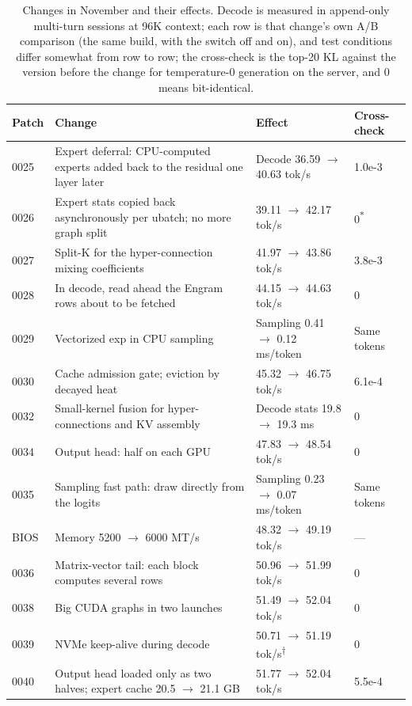 \documentclass[11pt,a4paper]{article}
\newcommand{\tps}{tok/s}
\begin{document}
\begin{table}[!tp]
  \centering
  \small
  \caption{Changes in November and their effects. Decode is measured in append-only multi-turn sessions at 96K context; each row is that change's own A/B comparison (the same build, with the switch off and on), and test conditions differ somewhat from row to row; the cross-check is the top-20 KL against the version before the change for temperature-0 generation on the server, and 0 means bit-identical.}
  \label{tab:summary2}
  \begin{tabularx}{\textwidth}{@{}l X l l@{}}
    \toprule
    Patch & Change & Effect & Cross-check \\
    \midrule
    0025 & Expert deferral: CPU-computed experts added back to the residual one layer later & Decode 36.59 $\to$ 40.63 \tps{} & 1.0e-3 \\
    0026 & Expert stats copied back asynchronously per ubatch; no more graph split & 39.11 $\to$ 42.17 \tps{} & 0\textsuperscript{*} \\
    0027 & Split-K for the hyper-connection mixing coefficients & 41.97 $\to$ 43.86 \tps{} & 3.8e-3 \\
    0028 & In decode, read ahead the Engram rows about to be fetched & 44.15 $\to$ 44.63 \tps{} & 0 \\
    0029 & Vectorized exp in CPU sampling & Sampling 0.41 $\to$ 0.12 ms/token & Same tokens \\
    0030 & Cache admission gate; eviction by decayed heat & 45.32 $\to$ 46.75 \tps{} & 6.1e-4 \\
    0032 & Small-kernel fusion for hyper-connections and KV assembly & Decode stats 19.8 $\to$ 19.3 ms & 0 \\
    0034 & Output head: half on each GPU & 47.83 $\to$ 48.54 \tps{} & 0 \\
    0035 & Sampling fast path: draw directly from the logits & Sampling 0.23 $\to$ 0.07 ms/token & Same tokens \\
    BIOS & Memory 5200 $\to$ 6000 MT/s & 48.32 $\to$ 49.19 \tps{} & --- \\
    0036 & Matrix-vector tail: each block computes several rows & 50.96 $\to$ 51.99 \tps{} & 0 \\
    0038 & Big CUDA graphs in two launches & 51.49 $\to$ 52.04 \tps{} & 0 \\
    0039 & NVMe keep-alive during decode & 50.71 $\to$ 51.19 \tps{}\textsuperscript{†} & 0 \\
    0040 & Output head loaded only as two halves; expert cache 20.5 $\to$ 21.1 GB & 51.77 $\to$ 52.04 \tps{} & 5.5e-4 \\

\end{tabularx}
\end{table}
\end{document}
